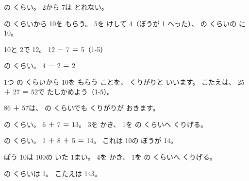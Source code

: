 \noindent\begin{minipage}[c]{0.34\linewidth}\centering
{}
\end{minipage}\hfill
\begin{minipage}[c]{0.64\linewidth}
\begin{enumerate}[label={\bkcircled[bkTheme]{\arabic*}}, leftmargin=2\zw, itemsep=0pt, topsep=0pt]
\item {}の くらい。 2から 7は とれない。
\item {}の くらいから 10を もらう。 5を けして 4（ぼうが 1 へった）、 の くらいの に 10。
\item 10と 2で 12。 12 － 7 ＝ 5（1-5）
\item {}の くらい。 4 － 2 ＝ 2
\end{enumerate}
\end{minipage}
\par\vspace{2pt}
\noindent 1つ の くらいから 10を もらう ことを、 くりがりと いいます。 こたえは、 25 ＋ 27 ＝ 52で たしかめよう（1-5）。

\clearpage
{}

\label{bk:1-7:hyaku}86 ＋ 57は、 の くらいでも くりがりが おきます。

\noindent\begin{minipage}[c]{0.3\linewidth}\centering
{}
\end{minipage}\hfill
\begin{minipage}[c]{0.68\linewidth}
\begin{enumerate}[label={\bkcircled[bkTheme]{\arabic*}}, leftmargin=2\zw, itemsep=0pt, topsep=0pt]
\item {}の くらい。 6 ＋ 7 ＝ 13。 3を かき、 1を の くらいへ くりげる。
\item {}の くらい。 1 ＋ 8 ＋ 5 ＝ 14。 これは 10の ぼうが 14。
\item ぼう 10は 100の いた 1まい。 4を かき、 1を の くらいへ くりげる。
\item {}の くらいは 1。 こたえは 143。
\end{enumerate}
\end{minipage}

